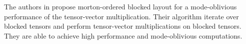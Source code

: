The authors in \cite{pawlowski:2019:morton.tensor.computations} propose morton-ordered blocked layout for a mode-oblivious performance of the tensor-vector multiplication.
Their algorithm iterate over blocked tensors and perform tensor-vector multiplications on blocked tensors.
They are able to achieve high performance and mode-oblivious computations.


